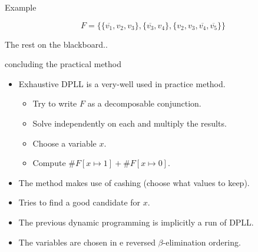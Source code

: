 \begin{frame}[t]{Example}
	\begin{center}
		\resizebox{.45\columnwidth}{!}{
		
		}
		$$F = \{\{\overline{v_1}, v_2, v_3\}, \{\overline{v_3}, v_4\}, \{v_2, v_3, \overline{v_4}, \overline{v_5}\}\}$$
	\end{center}
	\vspace{1cm}\hspace{7cm}The rest on the blackboard..
\end{frame}
\begin{frame}[t]{concluding the practical method}
	\begin{itemize}[<+->]
		\item Exhaustive DPLL is a very-well used in practice method.
			\begin{itemize}
				\item Try to write $F$ as a decomposable conjunction. 
				\item[] \hspace{1cm}Solve independently on each and multiply the results.
				\item Choose a variable $x$.
				\item[] \hspace{1cm}Compute $\#F[x\mapsto 1] + \#F[x\mapsto 0]$.
			\end{itemize}
		\item The method makes use of cashing (choose what values to keep).
		\item Tries to find a good candidate for $x$.
		\item The previous dynamic programming is implicitly a run of DPLL. 
		\item The variables are chosen in e reversed $\beta$-elimination ordering. 
	\end{itemize}
\end{frame}
